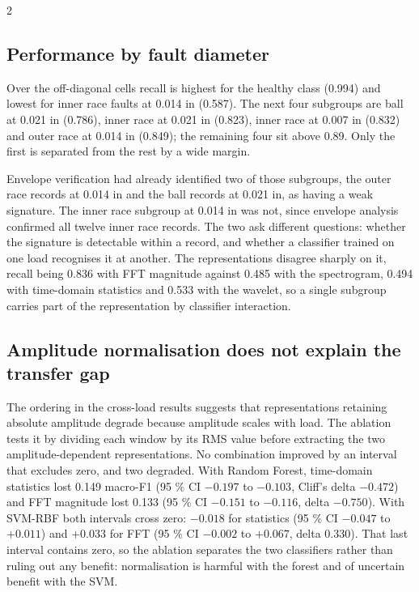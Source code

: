 \documentclass[12pt,twoside,titlepage]{ingenius}
\begin{document}
\begin{multicols}{2}
\subsection{Performance by fault diameter}

Over the off-diagonal cells recall is highest for the healthy class (0.994) and
lowest for inner race faults at 0.014 in (0.587). The next four subgroups are
ball at 0.021 in (0.786), inner race at 0.021 in (0.823), inner race at 0.007 in
(0.832) and outer race at 0.014 in (0.849); the remaining four sit above 0.89.
Only the first is separated from the rest by a wide margin.

Envelope verification had already identified two of those subgroups, the outer
race records at 0.014 in and the ball records at 0.021 in, as having a weak
signature. The inner race subgroup at 0.014 in was not, since envelope analysis
confirmed all twelve inner race records. The two ask different questions:
whether the signature is detectable within a record, and whether a classifier
trained on one load recognises it at another. The representations disagree
sharply on it, recall being 0.836 with
FFT magnitude against 0.485 with the spectrogram, 0.494 with time-domain
statistics and 0.533 with the wavelet, so a single subgroup carries part of the
representation by classifier interaction.

\subsection{Amplitude normalisation does not explain the transfer gap}

The ordering in the cross-load results suggests that representations retaining
absolute amplitude degrade because amplitude scales with load. The ablation
tests it by dividing each window by its RMS value before extracting the two
amplitude-dependent representations. No combination improved by an interval that
excludes zero, and two degraded. With Random Forest, time-domain statistics lost 0.149 macro-F1 (95 \% CI
$-0.197$ to $-0.103$, Cliff's delta $-0.472$) and FFT magnitude lost 0.133
(95 \% CI $-0.151$ to $-0.116$, delta $-0.750$). With SVM-RBF both intervals
cross zero: $-0.018$ for statistics (95 \% CI $-0.047$ to $+0.011$) and $+0.033$
for FFT (95 \% CI $-0.002$ to $+0.067$, delta 0.330). That last interval
contains zero, so the ablation separates the two classifiers rather
than ruling out any benefit: normalisation is harmful with the forest and of
uncertain benefit with the SVM.


\end{multicols}
\end{document}
